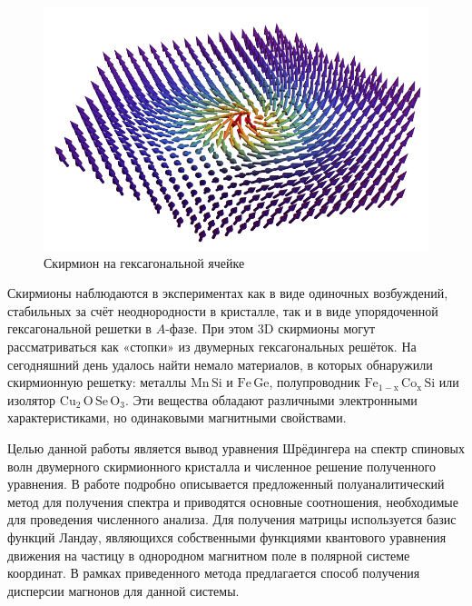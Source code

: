 \documentclass[a4paper,article,14pt]{extarticle}
\begin{document}
\begin{figure}[h]
	\centering
	\includegraphics[width=0.5\paperwidth]{images/skyrmionPic.png}
	\caption{Скирмион на гексагональной ячейке}
	\label{pic:skyrmion}
\end{figure}

Скирмионы наблюдаются в экспериментах как в виде одиночных возбуждений, стабильных за счёт неоднородности в кристалле\cite{rosch_muller}, так и в виде упорядоченной гексагональной решетки в $A$-фазе. \cite{mulhbauer} При этом 3D скирмионы могут рассматриваться как «стопки» из двумерных гексагональных решёток.\cite{milde, Rybakov2015}
На сегодняшний день удалось найти немало материалов, в которых обнаружили скирмионную решетку: металлы $\mathrm{Mn\,Si}$ и $\mathrm{Fe\,Ge}$, полупроводник $\mathrm{Fe_{1-x}\,Co_x\,Si}$ \cite{munzer} или изолятор $\mathrm{Cu_2\,O\, Se\, O_3}$. Эти вещества обладают различными электронными характеристиками, но одинаковыми магнитными свойствами. \cite{nagaosa}


Целью данной работы является вывод уравнения Шрёдингера на спектр спиновых волн двумерного скирмионного кристалла и численное решение полученного уравнения. В работе подробно описывается предложенный полуаналитический метод для получения спектра и приводятся основные соотношения, необходимые для проведения численного анализа. Для получения матрицы используется базис функций Ландау, являющихся собственными функциями квантового уравнения движения на частицу в однородном магнитном поле в полярной системе координат. В рамках приведенного метода предлагается способ получения дисперсии магнонов для данной системы.

\end{document}
